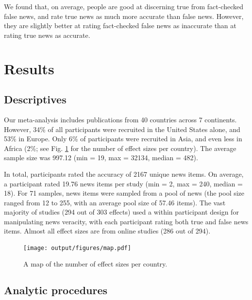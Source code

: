 \documentclass[
  man]{apa6}
\begin{document}
We found that, on average, people are good at discerning true from fact-checked false news, and rate true news as much more accurate than false news. However, they are slightly better at rating fact-checked false news as inaccurate than at rating true news as accurate.

\section{Results}\label{results}

\subsection{Descriptives}\label{descriptives}

Our meta-analysis includes publications from 40 countries across 7 continents. However, 34\% of all participants were recruited in the United States alone, and 53\% in Europe. Only 6\% of participants were recruited in Asia, and even less in Africa (2\%; see Fig. \ref{fig:map} for the number of effect sizes per country). The average sample size was 997.12 (min = 19, max = 32134, median = 482).

In total, participants rated the accuracy of 2167 unique news items. On average, a participant rated 19.76 news items per study (min = 2, max = 240, median = 18). For 71 samples, news items were sampled from a pool of news (the pool size ranged from 12 to 255, with an average pool size of 57.46 items). The vast majority of studies (294 out of 303 effects) used a within participant design for manipulating news veracity, with each participant rating both true and false news items. Almost all effect sizes are from online studies (286 out of 294).



\begin{figure}
\centering
\texttt{[image: output/figures/map.pdf]}
\caption{\label{fig:map}A map of the number of effect sizes per country.}
\end{figure}

\subsection{Analytic procedures}\label{analytic-procedures}
\end{document}
